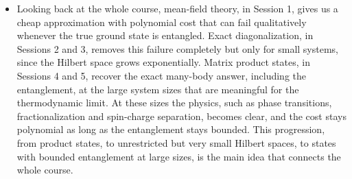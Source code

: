 \documentclass[lecture_notes.tex]{subfiles}
\begin{document}
\begin{itemize}[nosep]
    and to critical systems, respectively, and they are beyond the scope of this course.
  \item Looking back at the whole course, mean-field theory, in Session 1, gives us a cheap
    approximation with polynomial cost that can fail qualitatively whenever the true ground state is
    entangled. Exact diagonalization, in Sessions 2 and 3, removes this failure completely but only
    for small systems, since the Hilbert space grows exponentially. Matrix product states, in
    Sessions 4 and 5, recover the exact many-body answer, including the entanglement, at the large
    system sizes that are meaningful for the thermodynamic limit. At these sizes the physics, such
    as phase transitions, fractionalization and spin-charge separation, becomes clear, and the cost
    stays polynomial as long as the entanglement stays bounded. This progression, from product
    states, to unrestricted but very small Hilbert spaces, to states with bounded entanglement at
    large sizes, is the main idea that connects the whole course.
\end{itemize}
\end{document}
